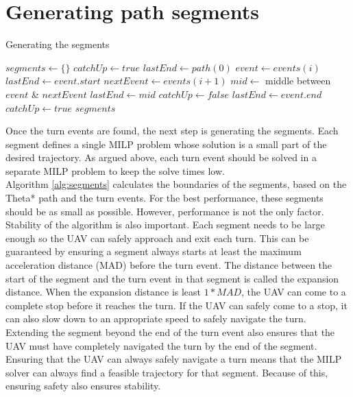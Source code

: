 \section{Generating path segments}
\begin{algorithm}
\caption{Generating the segments}
\label{alg:segments}
\begin{algorithmic}[1]
\State $segments \leftarrow \{\}$
\State $catchUp \leftarrow true$
\State $lastEnd \leftarrow path(0)$
\State $event \leftarrow events(i)$
	\State {} 
	\State {}
	\State $lastEnd \leftarrow event.start$
\EndIf
\State $nextEvent \leftarrow events(i+1)$
	\State $mid \leftarrow$ middle between $event$ \& $nextEvent$
	\State {}
	\State $lastEnd \leftarrow mid$
	\State $catchUp \leftarrow false$
\Else
	\State {} 
	\State {}
	\State $lastEnd \leftarrow event.end$
	\State $catchUp \leftarrow true$
\EndIf
\EndFor
\State {}
\Return $segments$
\EndFunction
\end{algorithmic}
\end{algorithm}
Once the turn events are found, the next step is generating the segments. Each segment defines a single MILP problem whose solution is a small part of the desired trajectory. As argued above, each turn event should be solved in a separate MILP problem to keep the solve times low. \\
Algorithm \ref{alg:segments} calculates the boundaries of the segments, based on the Theta* path and the turn events. For the best performance, these segments should be as small as possible. However, performance is not the only factor. Stability of the algorithm is also important. Each segment needs to be large enough so the UAV can safely approach and exit each turn. This can be guaranteed by ensuring a segment always starts at least the maximum acceleration distance (MAD) before the turn event. The distance between the start of the segment and the turn event in that segment is called the expansion distance. When the expansion distance is least $1*MAD$, the UAV can come to a complete stop before it reaches the turn. If the UAV can safely come to a stop, it can also slow down to an appropriate speed to safely navigate the turn. Extending the segment beyond the end of the turn event also ensures that the UAV must have completely navigated the turn by the end of the segment. Ensuring that the UAV can always safely navigate a turn means that the MILP solver can always find a feasible trajectory for that segment. Because of this, ensuring  safety also ensures stability. \\
